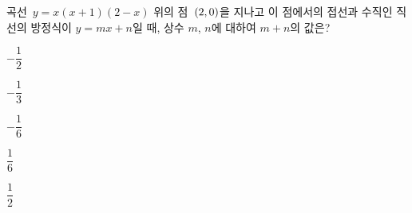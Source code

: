 곡선~$y=x(x+1)(2-x)$ 위의 점~$(2{,}\mkern3mu\mathopen{}0)$을 지나고 이 점에서의 접선과 수직인 직선의 방정식이 $y=mx+n$일 때, 상수 $m$, $n$에 대하여 $m+n$의 값은?
\begin{choices32}{\rule[-3ex]{0pt}{8ex}$-\dfrac{1}{2}$}{\rule[-3ex]{0pt}{8ex}$-\dfrac{1}{3}$}{\rule[-3ex]{0pt}{8ex}$-\dfrac{1}{6}$}{\rule[-3ex]{0pt}{8ex}$\dfrac{1}{6}$}{\rule[-3ex]{0pt}{8ex}$\dfrac{1}{2}$}\end{choices32}
